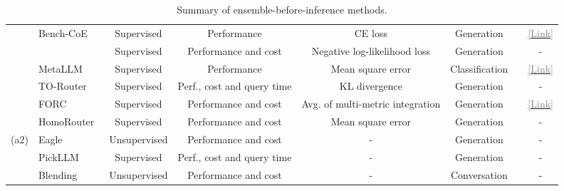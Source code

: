 \documentclass{article}
\newcommand{\cmark}{\ding{51}}%
\newcommand{\xmark}{\ding{55}}%
\begin{document}
\begin{table}[t!]
{\begin{tabular}{llcc c c c c}
  &
Bench-CoE~\cite{wang2024bench}   & Supervised &Performance&  CE loss&Generation&\cmark&\href{https://github.com/ZhangXJ199/Bench-CoE}{\textcolor{gray}{[Link]}}\\
  &
\cellcolor[rgb]{ .867, .922, .969}\cite{li2025llm}   & \cellcolor[rgb]{ .867, .922, .969}Supervised &\cellcolor[rgb]{ .867, .922, .969}Performance and cost & \cellcolor[rgb]{ .867, .922, .969}Negative log-likelihood loss&\cellcolor[rgb]{ .867, .922, .969}Generation&\cellcolor[rgb]{ .867, .922, .969}\cmark&\cellcolor[rgb]{ .867, .922, .969}-\\
  &
MetaLLM~\cite{nguyen2024metallm}  & Supervised &Performance & Mean square error& Classification&\xmark&\href{https://github.com/mail-research/MetaLLM-wrapper/}{\textcolor{gray}{[Link]}}\\
  &
\cellcolor[rgb]{ .867, .922, .969}TO-Router~\cite{stripelis2024tensoropera}   & \cellcolor[rgb]{ .867, .922, .969}Supervised &\cellcolor[rgb]{ .867, .922, .969}Perf., cost and query time & \cellcolor[rgb]{ .867, .922, .969}KL divergence&\cellcolor[rgb]{ .867, .922, .969}Generation&\cellcolor[rgb]{ .867, .922, .969}\cmark&\cellcolor[rgb]{ .867, .922, .969}-\\
  &
FORC~\cite{vsakota2024fly}& Supervised &Performance and cost & Avg. of multi-metric integration&Generation&\cmark&\href{https://github.com/epfl-dlab/forc}{\textcolor{gray}{[Link]}}\\
  &
\cellcolor[rgb]{ .867, .922, .969}HomoRouter~\cite{mu2024adaptive}& \cellcolor[rgb]{ .867, .922, .969}Supervised &\cellcolor[rgb]{ .867, .922, .969}Performance and cost & \cellcolor[rgb]{ .867, .922, .969}Mean square error &\cellcolor[rgb]{ .867, .922, .969}Generation&\cellcolor[rgb]{ .867, .922, .969}\cmark&\cellcolor[rgb]{ .867, .922, .969}-\\
\cmidrule{2-8} 
 \multirow{ 3}{*}{(a2)}  
   &
Eagle~\cite{zhao2024eagle} & Unsupervised & Performance and cost & - & Generation  &\xmark&-\\
 &
\cellcolor[rgb]{ .867, .922, .969}PickLLM~\cite{sikeridis2024pickllm}  &\cellcolor[rgb]{ .867, .922, .969}Supervised & \cellcolor[rgb]{ .867, .922, .969}Perf., cost and query time& \cellcolor[rgb]{ .867, .922, .969}-&\cellcolor[rgb]{ .867, .922, .969}Generation&\cellcolor[rgb]{ .867, .922, .969}\cmark&\cellcolor[rgb]{ .867, .922, .969}- \\

  &
Blending~\cite{lu2024blending} & Unsupervised & Performance and cost & - & Conversation  &\xmark&-\\

    \bottomrule
    \end{tabular}
    }
    \caption{Summary of ensemble-before-inference methods.}
    \label{tab:Ensemble-before-inference}
\end{table}
\end{document}
